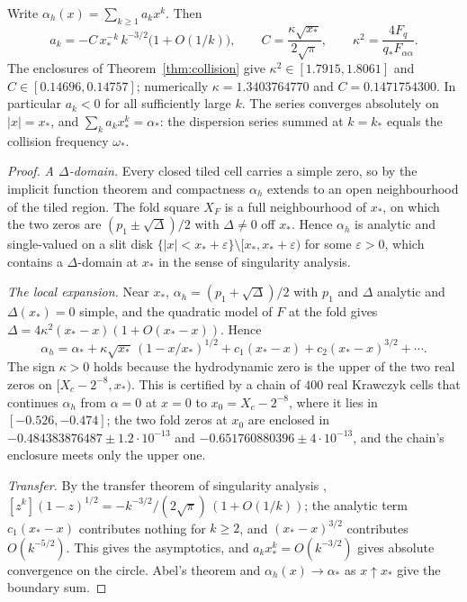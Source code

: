 \begin{corollary}\label{cor:darboux}
Write $\alpha_h(x)=\sum_{k\ge1}a_kx^k$. Then
\[
a_k=-C\,x_*^{-k}\,k^{-3/2}\bigl(1+O(1/k)\bigr),\qquad C=\frac{\kappa\sqrt{x_*}}{2\sqrt\pi},\qquad \kappa^2=\frac{4F_q}{q_*F_{\alpha\alpha}}.
\]
The enclosures of Theorem~\ref{thm:collision} give $\kappa^2\in[1.7915,1.8061]$ and $C\in[0.14696,0.14757]$; numerically $\kappa=1.3403764770$ and $C=0.1471754300$. In particular $a_k<0$ for all sufficiently large $k$. The series converges absolutely on $|x|=x_*$, and $\sum_ka_kx_*^k=\alpha_*$: the dispersion series summed at $k=k_*$ equals the collision frequency $\omega_*$.
\end{corollary}
\begin{proof}
\emph{A $\Delta$-domain.} Every closed tiled cell carries a simple zero, so by the implicit function theorem and compactness $\alpha_h$ extends to an open neighbourhood of the tiled region. The fold square $X_F$ is a full neighbourhood of $x_*$, on which the two zeros are $(p_1\pm\sqrt\Delta)/2$ with $\Delta\ne0$ off $x_*$. Hence $\alpha_h$ is analytic and single-valued on a slit disk $\{|x|<x_*+\varepsilon\}\setminus[x_*,x_*+\varepsilon)$ for some $\varepsilon>0$, which contains a $\Delta$-domain at $x_*$ in the sense of singularity analysis.

\emph{The local expansion.} Near $x_*$, $\alpha_h=(p_1+\sqrt\Delta)/2$ with $p_1$ and $\Delta$ analytic and $\Delta(x_*)=0$ simple, and the quadratic model of $F$ at the fold gives $\Delta=4\kappa^2(x_*-x)(1+O(x_*-x))$. Hence
\[
\alpha_h=\alpha_*+\kappa\sqrt{x_*}\,(1-x/x_*)^{1/2}+c_1(x_*-x)+c_2(x_*-x)^{3/2}+\cdots.
\]
The sign $\kappa>0$ holds because the hydrodynamic zero is the upper of the two real zeros on $[X_c-2^{-8},x_*)$. This is certified by a chain of $400$ real Krawczyk cells that continues $\alpha_h$ from $\alpha=0$ at $x=0$ to $x_0=X_c-2^{-8}$, where it lies in $[-0.526,-0.474]$; the two fold zeros at $x_0$ are enclosed in $-0.484383876487\pm1.2\cdot10^{-13}$ and $-0.651760880396\pm4\cdot10^{-13}$, and the chain's enclosure meets only the upper one.

\emph{Transfer.} By the transfer theorem of singularity analysis \cite{FlajoletOdlyzko}, $[z^k](1-z)^{1/2}=-k^{-3/2}/(2\sqrt\pi)\,(1+O(1/k))$; the analytic term $c_1(x_*-x)$ contributes nothing for $k\ge2$, and $(x_*-x)^{3/2}$ contributes $O(k^{-5/2})$. This gives the asymptotics, and $a_kx_*^k=O(k^{-3/2})$ gives absolute convergence on the circle. Abel's theorem and $\alpha_h(x)\to\alpha_*$ as $x\uparrow x_*$ give the boundary sum.
\end{proof}

